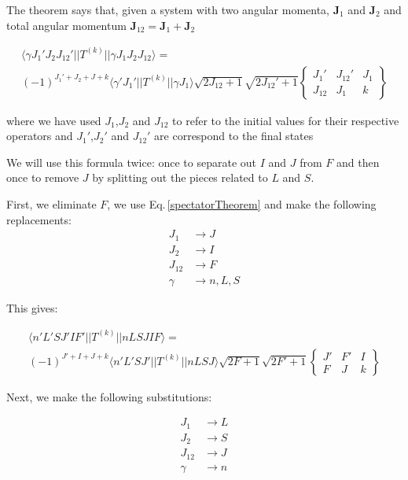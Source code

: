 The theorem says that, given a system with two angular momenta, $\mathbf{J}_1$ and $\mathbf{J}_2$ and total angular momentum $\mathbf{J}_{12}=\mathbf{J}_1+\mathbf{J}_2$ 

\begin{multline}\label{spectatorTheorem}
\langle\gamma J_1'J_2J_{12}'||T^{(k)}||\gamma J_1 J_2 J_{12}\rangle=
\\(-1)^{J_1'+J_2+J+k}\langle\gamma'J_1'||T^{(k)}||\gamma J_1\rangle
\sqrt{2J_{12}+1}\sqrt{2J_{12}'+1}
\begin{Bmatrix}
J_1' & J_{12}' & J_1 \\
J_{12} & J_1 & k
\end{Bmatrix}
\end{multline}

where we have used $J_{1}$,$J_{2}$ and $J_{12}$ to refer to the initial values for their respective operators and $J_{1}'$,$J_{2}'$ and $J_{12}'$ are correspond to the final states

We will use this formula twice: once to separate out $I$ and $J$ from $F$ and then once to remove $J$ by splitting out the pieces related to $L$ and $S$.


First, we eliminate $F$, we use Eq.\,\ref{spectatorTheorem} and make the following replacements:
\begin{align}
J_1&\rightarrow J\\
J_2&\rightarrow I\\
J_{12}&\rightarrow F\\
\gamma &\rightarrow  n,L,S
\end{align}

This gives: 

\begin{multline}\label{spectatorTheorem1}
\langle n' L' S J' I F'||T^{(k)}||n L S J I F\rangle=
\\(-1)^{J'+I+J+k}\langle n'L' S J'||T^{(k)}|| n L S J\rangle
\sqrt{2F+1}\sqrt{2F'+1}
\begin{Bmatrix}
J' & F' & I \\
F & J & k
\end{Bmatrix}
\end{multline}

Next, we make the following substitutions: 

\begin{align}
J_1&\rightarrow L\\
J_2&\rightarrow S\\
J_{12}&\rightarrow J\\
\gamma & \rightarrow n
\end{align}

